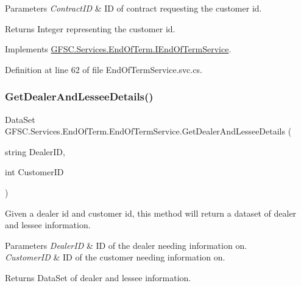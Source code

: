 \begin{DoxyParams}{Parameters}
{\em Contract\+ID} & ID of contract requesting the customer id.\\
\hline
\end{DoxyParams}
\begin{DoxyReturn}{Returns}
Integer representing the customer id.
\end{DoxyReturn}


Implements \mbox{\hyperlink{interface_g_f_s_c_1_1_services_1_1_end_of_term_1_1_i_end_of_term_service_a615c57f7fceacec4ebe4167707393723}{G\+F\+S\+C.\+Services.\+End\+Of\+Term.\+I\+End\+Of\+Term\+Service}}.



Definition at line 62 of file End\+Of\+Term\+Service.\+svc.\+cs.

\mbox{\label{class_g_f_s_c_1_1_services_1_1_end_of_term_1_1_end_of_term_service_acc90f4e6a7e6d367386c25f475ec90cb}} 
\subsubsection{\texorpdfstring{Get\+Dealer\+And\+Lessee\+Details()}{GetDealerAndLesseeDetails()}}
{\footnotesize\ttfamily Data\+Set G\+F\+S\+C.\+Services.\+End\+Of\+Term.\+End\+Of\+Term\+Service.\+Get\+Dealer\+And\+Lessee\+Details (\begin{DoxyParamCaption}\item[{string}]{Dealer\+ID,  }\item[{int}]{Customer\+ID }\end{DoxyParamCaption})}



Given a dealer id and customer id, this method will return a dataset of dealer and lessee information. 


\begin{DoxyParams}{Parameters}
{\em Dealer\+ID} & ID of the dealer needing information on.\\
\hline
{\em Customer\+ID} & ID of the customer needing information on.\\
\hline
\end{DoxyParams}
\begin{DoxyReturn}{Returns}
Data\+Set of dealer and lessee information.
\end{DoxyReturn}


